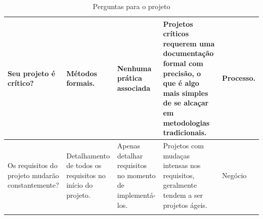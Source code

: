\begin{longtable}{|p{3.5cm}|p{3.5cm}|p{3.5cm}|p{3.5cm}|p{2cm}|}
		Seu projeto é crítico? &
		Métodos formais. &
		Nenhuma prática associada &
		Projetos críticos requerem uma documentação formal com precisão, o que é algo mais simples de se alcaçar em metodologias tradicionais. &
		Processo.
		\\ \hline

		Os requisitos do projeto mudarão constantemente? &
		Detalhamento de todos os requisitos no início do projeto. &
		Apenas detalhar requisitos no momento de implementá-los. &
		Projetos com mudaças intensas nos requisitos, geralmente tendem a ser projetos ágeis. &
		Negócio
		\\ \hline
	\caption{Perguntas para o projeto}
	\label{tab:perguntas_projeto}
	\end{longtable}
